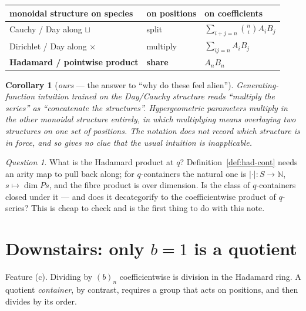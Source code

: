 \documentclass[11pt,a4paper]{article}
\newtheorem{corollary}[theorem]{Corollary}
\theoremstyle{definition}
\theoremstyle{remark}
\newtheorem{question}[theorem]{Question}
\newcommand{\NN}{\mathbb{N}}
\newcommand{\norm}[1]{\lvert #1 \rvert}
\begin{document}
\begin{center}
\small
\renewcommand{\arraystretch}{1.2}
\begin{tabular}{@{}lll@{}}
\toprule
monoidal structure on species & on positions & on coefficients \\
\midrule
Cauchy / Day along $\sqcup$ & split & $\sum_{i+j=n}\binom{n}{i}A_iB_j$ \\
Dirichlet / Day along $\times$ & multiply & $\sum_{ij=n}A_iB_j$ \\
\textbf{Hadamard / pointwise product} & \textbf{share} & $\boxed{A_nB_n}$ \\
\bottomrule
\end{tabular}
\end{center}

\begin{corollary}[\emph{ours} --- the answer to ``why do these feel alien''] \label{cor:alien}
Generating-function intuition trained on the Day/Cauchy structure reads
``multiply the series'' as ``concatenate the structures''. Hypergeometric parameters
multiply in the other monoidal structure entirely, in which multiplying means
overlaying two structures on one set of positions. The notation does not record which
structure is in force, and so gives no clue that the usual intuition is inapplicable.
\end{corollary}

\begin{question}\label{q:had-q}
What is the Hadamard product at $q$? Definition~\ref{def:had-cont} needs an arity map
to pull back along; for $q$-containers the natural one is
$\norm{\cdot} : S \to \NN$, $s \mapsto \dim P s$, and the fibre product is over
dimension. Is the class of $q$-containers closed under it --- and does it
decategorify to the coefficientwise product of $q$-series? This is cheap to check and
is the first thing to do with this note.
\end{question}

\section{Downstairs: only $b = 1$ is a quotient}

Feature (c). Dividing by $(b)_n$ coefficientwise is division in the Hadamard ring. A
quotient \emph{container}, by contrast, requires a group that acts on positions, and
then divides by its order.
\end{document}
